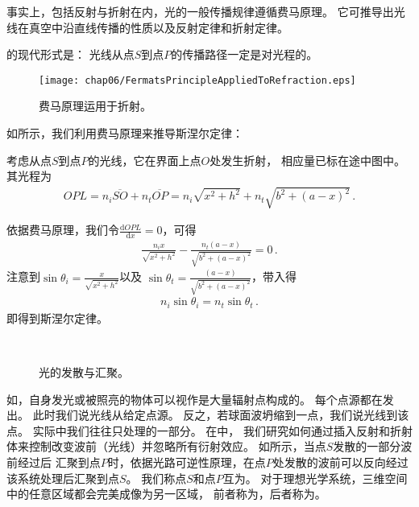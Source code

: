 事实上，包括反射与折射在内，光的一般传播规律遵循费马原理。
它可推导出光线在真空中沿直线传播的性质以及反射定律和折射定律。
\begin{proposition}
    的现代形式是：
    光线从点$S$到点$P$的传播路径一定是对光程的。
\end{proposition}

\begin{figure}[htbp]
    \centering\texttt{[image: chap06/FermatsPrincipleAppliedToRefraction.eps]}
    \caption{费马原理运用于折射。}
    \label{fig:6.28}
\end{figure}

如所示，我们利用费马原理来推导斯涅尔定律：
\begin{prove}
    考虑从点$S$到点$P$的光线，它在界面上点$O$处发生折射，
    相应量已标在途中图中。其光程为
    \begin{align}
        OPL=n_i\overline{SO}+n_t\overline{OP}=n_i\sqrt{x^2+h^2}+n_t\sqrt{b^2+(a-x)^2}\, .
    \end{align}

    依据费马原理，我们令$\displaystyle\frac{\mathrm{d}OPL}{\mathrm{d}x}=0$，可得
    \begin{align}
        \frac{n_ix}{\sqrt{x^2+h^2}}-\frac{n_t(a-x)}{\sqrt{b^2+(a-x)^2}}=0\, .
    \end{align}
    注意到$\displaystyle\sin\theta_i=\frac{x}{\sqrt{x^2+h^2}}$以及
    $\displaystyle\sin\theta_t=\frac{(a-x)}{\sqrt{b^2+(a-x)^2}}$，带入得
    \begin{align}
        n_i\sin\theta_i=n_t\sin\theta_t\, .
    \end{align}
    即得到斯涅尔定律。
\end{prove}

\begin{figure}[htbp]
    \centering
    \,
    \caption{光的发散与汇聚。}
    \label{fig:6.29}
\end{figure}

如，自身发光或被照亮的物体可以视作是大量辐射点构成的。
每个点源都在发出。
此时我们说光线从给定点源。
反之，若球面波坍缩到一点，我们说光线到该点。
实际中我们往往只处理的一部分。
在中，
我们研究如何通过插入反射和折射体来控制改变波前（光线）并忽略所有衍射效应。
如所示，当点$S$发散的一部分波前经过后
汇聚到点$P$时，依据光路可逆性原理，在点$P$处发散的波前可以反向经过该系统处理后汇聚到点$S$。
我们称点$S$和点$P$互为。
对于理想光学系统，三维空间中的任意区域都会完美成像为另一区域，
前者称为，后者称为。

